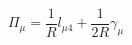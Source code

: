 \begin{equation}
\Pi_\mu = \frac{1}{R} l_{\mu4} + \frac{1}{2R} \gamma_\mu   \label{1-6}
\end{equation}

